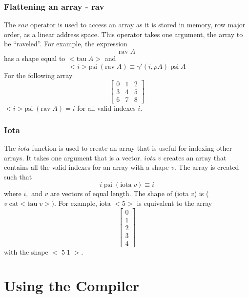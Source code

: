 \subsubsection{Flattening an array - rav}
The $rav$ operator is used to access an array as it is stored
in memory, row major order, as a linear address space.  This operator takes
one argument, the array to be ``raveled''.  For example, the expression
$$\mbox{rav}\;A$$ has a shape equal to $<\mbox{tau}\;A>$ and
$$<i>\mbox{psi}\;(\mbox{rav}\;A)\equiv\gamma'(i,\rho A)\;\mbox{psi}\;A$$
For the following array
$$\left[ \begin{array}{lll}
0 & 1 & 2 \\
3 & 4 & 5 \\
6 & 7 & 8 
\end{array} \right] $$
$<i>\mbox{psi}\;(\mbox{rav}\; A)=i$ for all valid indexes $i$.

\subsubsection{Iota}
The $iota$ function is used to create an array that is useful for indexing
other arrays.  It takes one argument that is a vector.  $iota\;v$
creates an array that contains all the valid indexes for an array with a shape
$v$.  The array is created such that 
$$i\;\mbox{psi}\;(\mbox{iota}\;v)\equiv i$$ 
where $i,$ and $v$ are vectors of
equal length.  The shape of (iota $v$) is ($v\;\mbox{cat}<\mbox{tau}\;v>)$.  
For example, iota $<5>$ is equivalent to the array
$$\left[ \begin{array}{l}
0 \\
1 \\
2 \\
3 \\
4
\end{array} \right]$$
with the shape $<\;5\;1\;>$.

\section{Using the Compiler}
